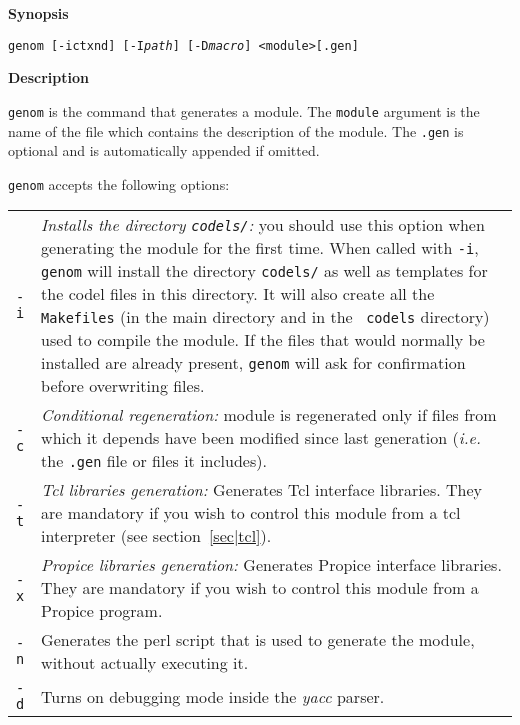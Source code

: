 \begin{description}

\item{\bf Synopsis}

{\tt genom [-ictxnd] [-I{\em path}] [-D{\em macro}] <module>[.gen]}

\item{\bf Description}

{\tt genom}  is the  command that  generates a  module. The  {\tt module}
argument is the name  of the file which  contains the description of  the
module. The {\tt  .gen} is   optional and  is  automatically appended  if
omitted.

{\tt genom} accepts the following options:

\begin{tabularx}{\linewidth}{lX}
{\tt -i} &  {\em Installs the  directory  {\tt codels/}:} you should  use
this option when  generating the module  for the first time. When  called
with {\tt -i}, {\tt  genom} will install  the directory {\tt  codels/} as
well as templates for  the codel files in this  directory.  It  will also
create  all the {\tt Makefiles}  (in the main directory   and in the {\tt
codels} directory) used to compile  the module.  If  the files that would
normally be  installed  are already present, {\tt   genom}  will ask  for
confirmation before overwriting files.\\

{\tt -c} & {\em Conditional regeneration:} module is regenerated only
if files from which  it depends have  been modified since last generation
({\em i.e.} the {\tt .gen} file or files it includes).\\

{\tt -t} &    {\em Tcl libraries  generation:}    Generates Tcl interface
libraries. They are mandatory  if you wish to  control this module from a
tcl interpreter (see section~\ref{sec|tcl}).\\

{\tt    -x}  & {\em    Propice   libraries generation:} Generates Propice
interface libraries.  They are  mandatory  if you   wish to  control this
module from a Propice program.\\

{\tt -n} & Generates the perl script that is used to generate the module,
without actually executing it.\\

{\tt -d} & Turns on debugging mode inside the {\em yacc} parser.\\


\end{tabularx}
\end{description}

